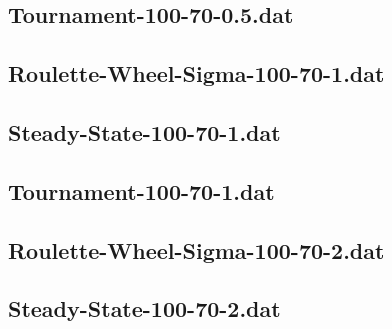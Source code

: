 \documentclass[titlepage, a4paper, 12pt]{article}
\begin{document}
\subsection{Tournament-100-70-0.5.dat}\label{Tournament-100-70-0.5.dat}
\begin{footnotesize}
  
\end{footnotesize}


\subsection{Roulette-Wheel-Sigma-100-70-1.dat}\label{Roulette-Wheel-Sigma-100-70-1.dat}
\begin{footnotesize}
  
\end{footnotesize}

\subsection{Steady-State-100-70-1.dat}\label{Steady-State-100-70-1.dat}
\begin{footnotesize}
  
\end{footnotesize}

\subsection{Tournament-100-70-1.dat}\label{Tournament-100-70-1.dat}
\begin{footnotesize}
  
\end{footnotesize}

\subsection{Roulette-Wheel-Sigma-100-70-2.dat}\label{Roulette-Wheel-Sigma-100-70-2.dat}
\begin{footnotesize}
  
\end{footnotesize}

\subsection{Steady-State-100-70-2.dat}\label{Steady-State-100-70-2.dat}
\begin{footnotesize}
  
\end{footnotesize}
\end{document}

